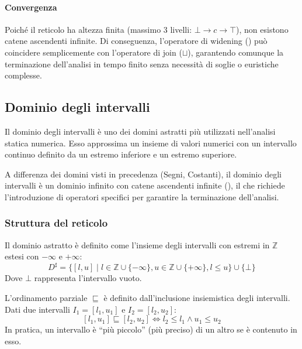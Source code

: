 \paragraph{Convergenza}
Poiché il reticolo ha altezza finita (massimo 3 livelli: $\bot \to c \to
\top$), non esistono catene ascendenti infinite.
Di conseguenza, l'operatore di widening () può
coincidere semplicemente con l'operatore di join ($\sqcup$), garantendo
comunque la terminazione dell'analisi in tempo finito senza necessità
di soglie o euristiche complesse.

\subsection{Dominio degli intervalli}

Il dominio degli intervalli è uno dei domini astratti più utilizzati
nell'analisi statica numerica.
Esso approssima un insieme di valori numerici con un intervallo continuo
definito da un estremo inferiore e un estremo superiore.

A differenza dei domini visti in precedenza (Segni, Costanti), il dominio
degli intervalli è un dominio infinito con catene ascendenti infinite
(), il che richiede l'introduzione di operatori
specifici per garantire la terminazione dell'analisi.

\subsubsection{Struttura del reticolo}

Il dominio astratto è definito come l'insieme degli intervalli con estremi
in $\mathbb{Z}$ estesi con $-\infty$ e $+\infty$:
\[
D^\sharp = \{ [l, u] \mid l \in \mathbb{Z} \cup \{-\infty\}, u \in \mathbb{Z} \cup \{+\infty\}, l \leq u \} \cup \{ \bot \}
\]
Dove $\bot$ rappresenta l'intervallo vuoto.

L'ordinamento parziale $\sqsubseteq$ è definito dall'inclusione insiemistica
degli intervalli. Dati due intervalli $I_1 = [l_1, u_1]$ e $I_2 = [l_2, u_2]$:
\[
[l_1, u_1] \sqsubseteq [l_2, u_2] \iff l_2 \leq l_1 \land u_1 \leq u_2
\]
In pratica, un intervallo è ``più piccolo'' (più preciso) di un altro se è
contenuto in esso.

